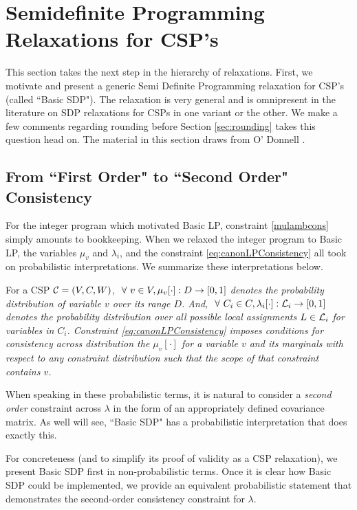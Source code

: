\section{Semidefinite Programming Relaxations for CSP's}\label{sec:sdpRelax}
This section takes the next step in the hierarchy of relaxations. First, we motivate and present a generic Semi Definite Programming relaxation for CSP's (called ``Basic SDP"). The relaxation is very general and is omnipresent in the literature on SDP relaxations for CSPs in one variant or the other. We make a few comments regarding rounding before Section \ref{sec:rounding} takes this question head on. The material in this section draws from O' Donnell \cite{Ryan}.

\subsection{From ``First Order" to ``Second Order" Consistency }

For the integer program which motivated Basic LP, constraint \ref{mulambcons} simply amounts to bookkeeping. When we relaxed the integer program to Basic LP, the variables $\mu_v$ and $\lambda_i$, and the constraint \ref{eq:canonLPConsistency} all took on probabilistic interpretations. We summarize these interpretations below.

For a CSP $\mathcal{C} = (V, C, W)$,  \textit{$\ \forall \  v \in V, \mu_v[\cdot] : D \rightarrow [0, 1]$ denotes the \textit{probability distribution of variable $v$ over its range $D$}. And, $\ \forall \  C_i \in C, \lambda_{i}[\cdot] : \mathcal{L}_{i} \rightarrow [0,1]$ denotes the probability distribution over all possible local assignments $L \in \mathcal{L}_{i}$ for variables in  $C_i$.  
Constraint \ref{eq:canonLPConsistency} imposes conditions for consistency across distribution the $\mu_v[\cdot]$ for a variable $v$ and its marginals with respect to any constraint distribution such that the scope of that constraint contains $v$.}

When speaking in these probabilistic terms, it is natural to consider a \textit{second order} constraint across $\lambda$ in the form of an appropriately defined covariance matrix. As well will see, ``Basic SDP" has a probabilistic interpretation that does exactly this. 

For concreteness (and to simplify its proof of validity as a CSP relaxation), we present Basic SDP first in non-probabilistic terms. Once it is clear how Basic SDP could be implemented, we provide an equivalent probabilistic statement that demonstrates the second-order consistency constraint for $\lambda$.

